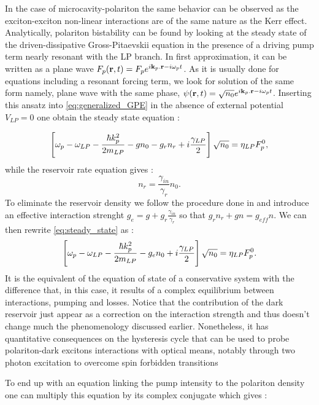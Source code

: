 In the case of microcavity-polariton the same behavior can be observed as the exciton-exciton non-linear interactions are of the same nature as the Kerr effect.
Analytically, polariton bistability can be found by looking at the steady state of the driven-dissipative Gross-Pitaevskii equation in the presence of a driving pump term nearly resonant with the LP branch. In first approximation, it can be written as a plane wave $F_p(\mathbf{r},t)=F_p e^{i\mathbf{k}_p.\mathbf{r}-i\omega_p t}$.
As it is usually done for equations including a resonant forcing term, we look for solution of the same form namely, plane wave with the same phase, $\psi(\mathbf{r},t)= \sqrt{n_0}e^{i\mathbf{k}_p.\mathbf{r}-i\omega_p t}$.
Inserting this ansatz into \autoref{eq:generalized_GPE} in the absence of external potential $V_{LP}=0$ one obtain the steady state equation :

\begin{equation}
    \left[\omega_p -\omega_{LP} - \dfrac{\hbar k_p^2}{2 m_{LP}} - g n_0 - g_rn_r + i \dfrac{\gamma_{LP}}{2} \right] \sqrt{n_0}= \eta_{LP} F_p^0,
    \label{eq:steady_state}
\end{equation}
while the reservoir rate equation gives :
\begin{equation}
    n_r = \dfrac{\gamma_{in}}{\gamma_r}n_0.
\end{equation}
To eliminate the reservoir density we follow the procedure done in \cite{stepanov_dispersion_2019} and introduce an effective interaction strenght $g_{e}=g+g_r\frac{\gamma_{in}}{\gamma_r}$ so that $g_rn_r+gn=g_{eff}n$. 
We can then rewrite \autoref{eq:steady_state} as :
\begin{equation}
    \left[\omega_p -\omega_{LP} - \dfrac{\hbar k_p^2}{2 m_{LP}} - g_{e}n_0 + i \dfrac{\gamma_{LP}}{2} \right] \sqrt{n_0}= \eta_{LP} F_p^0.
    \label{eq:steady_state_2}
\end{equation}
It is the equivalent of the equation of state of a conservative system with the difference that, in this case, it results of a complex equilibrium between interactions, pumping and losses. Notice that 
the contribution of the dark reservoir just appear as a correction on the interaction strength and thus doesn't change much the phenomenology discussed earlier. Nonetheless, it 
 has quantitative consequences on the hysteresis cycle that can be used to probe polariton-dark excitons interactions with optical means, notably through two photon excitation to overcome spin forbidden transitions \cite{dark_exciton_pol_interactions}

\bigskip

To end up with an equation linking the pump intensity to the polariton density one can multiply this equation by its complex conjugate which gives :


